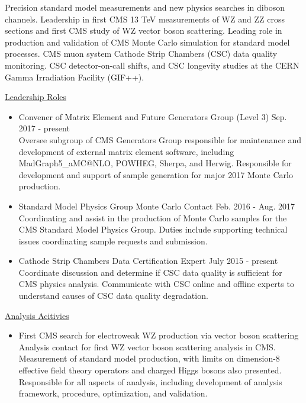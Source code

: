 \documentclass[10pt]{res} %
\begin{document}
\begin{resume}
Precision standard model measurements and new physics searches in diboson channels. Leadership in
first CMS 13 TeV measurements of WZ and ZZ cross sections and first CMS study of WZ vector boson scattering.
Leading role in production and validation of CMS Monte Carlo simulation for standard model
processes. CMS muon system Cathode Strip Chambers (CSC) data quality monitoring.
CSC detector-on-call shifts, and CSC longevity studies at the
CERN Gamma Irradiation Facility (GIF++).

\underline{Leadership Roles}
\vspace{2mm}
\begin{itemize}
  \item{Convener of Matrix Element and Future Generators Group (Level 3) \hfill{Sep. 2017 - present}} \\
    Oversee subgroup of CMS Generators Group
    responsible for maintenance and development of external matrix element software, 
    including MadGraph5\_aMC@NLO, POWHEG, Sherpa, and Herwig. Responsible for development and support of sample generation for
    major 2017 Monte Carlo production.
  \item{Standard Model Physics Group Monte Carlo Contact \hfill{Feb. 2016 - Aug. 2017}} \\
    Coordinating and assist 
    in the production of Monte Carlo samples for the CMS Standard Model Physics Group. 
    Duties include supporting technical issues coordinating sample requests and submission.
  \item{Cathode Strip Chambers Data Certification Expert \hfill{July 2015 - present}} \\
    Coordinate discussion and determine if
    CSC data quality is sufficient for CMS physics analysis.
    Communicate with CSC online and offline experts to understand
    causes of CSC data quality degradation.
\end{itemize}

\underline{Analysis Acitivies}
\vspace{2mm}
\begin{itemize}
  \item{First CMS search for electroweak WZ production via vector boson scattering}\\
    Analysis contact for first WZ vector boson scattering analysis in CMS. 
    Measurement of standard model production, with limits on dimension-8 
    effective field theory operators and charged Higgs bosons also presented.
    Responsible for all aspects of analysis, 
    including development of analysis framework, procedure, optimization, and validation. 


\end{itemize}
\end{resume}
\end{document}
